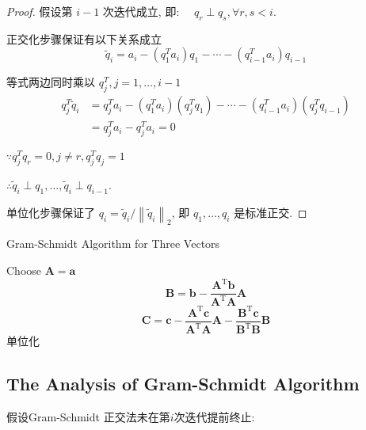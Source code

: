 \begin{proof}
    假设第 $ i-1 $ 次迭代成立,  即: $ \quad q_{r} \perp q_{s}, \forall r, s<i $.

    正交化步骤保证有以下关系成立
    $$ \widetilde{q}_{i}=a_{i}-\left(q_{1}^{T} a_{i}\right) q_{1}-\cdots-\left(q_{i-1}^{T} a_{i}\right) q_{i-1} $$

    等式两边同时乘以 $ q_{j}^{T}, j=1, \ldots, i-1 $
    $$ \begin{aligned} q_{j}^{T} \tilde{q}_{i} &=q_{j}^{T} a_{i}-\left(q_{1}^{T} a_{i}\right)\left(q_{j}^{T} q_{1}\right)-\cdots-\left(q_{i-1}^{T} a_{i}\right)\left(q_{j}^{T} q_{i-1}\right) \\ &=q_{j}^{T} a_{i}-q_{j}^{T} a_{i}=0  \end{aligned} $$

    $ \because q_{j}^{T} q_{r}=0, j \neq r, q_{j}^{T} q_{j}=1 $

     $\therefore \widetilde{q}_{i} \perp q_{1}, \ldots, \widetilde{q}_{i} \perp q_{i-1} $.

    单位化步骤保证了 $ q_{i}=\widetilde{q}_{i} /\left\|\widetilde{q}_{i}\right\|_{2} $, 即 $ q_{1}, \ldots, q_{i} $ 是标准正交. 
\end{proof}

\begin{algorithm}
    \caption{Gram-Schmidt Algorithm for Three Vectors}
    Choose $ \boldsymbol{A}=\boldsymbol{a} $\;
    $$ \boldsymbol{B}=\boldsymbol{b}-\frac{\boldsymbol{A}^{\mathrm{T}} \boldsymbol{b}}{\boldsymbol{A}^{\mathrm{T}} \boldsymbol{A}} \boldsymbol{A} $$\;
    $$ \boldsymbol{C}=\boldsymbol{c}-\frac{\boldsymbol{A}^{\mathrm{T}} \boldsymbol{c}}{\boldsymbol{A}^{\mathrm{T}} \boldsymbol{A}} \boldsymbol{A}-\frac{\boldsymbol{B}^{\mathrm{T}} \boldsymbol{c}}{\boldsymbol{B}^{\mathrm{T}} \boldsymbol{B}} \boldsymbol{B}   $$\;
    单位化\;
\end{algorithm}

\subsection{The Analysis of Gram-Schmidt Algorithm}

假设Gram-Schmidt 正交法未在第$i$次迭代提前终止:

